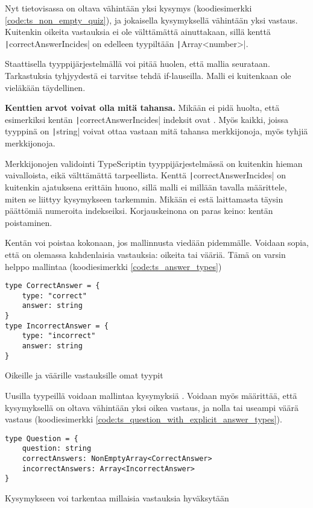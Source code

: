 Nyt tietovisassa on oltava vähintään yksi kysymys (koodiesimerkki \ref{code:ts_non_empty_quiz}), ja jokaisella kysymyksellä vähintään yksi vastaus. Kuitenkin oikeita vastauksia ei ole välttämättä ainuttakaan, sillä kenttä \texttt|correctAnswerIncides| on edelleen tyypiltään \texttt|Array<number>|.

Staattisella tyyppijärjestelmällä voi pitää huolen, että mallia seurataan. Tarkastuksia tyhjyydestä ei tarvitse tehdä if-lauseilla. Malli ei kuitenkaan ole vieläkään täydellinen.

\textbf{Kenttien arvot voivat olla mitä tahansa.} Mikään ei pidä huolta, että esimerkiksi kentän \texttt|correctAnswerIncides| indeksit ovat . Myös kaikki, joissa tyyppinä on \texttt|string| voivat ottaa vastaan mitä tahansa merkkijonoja, myös tyhjiä merkkijonoja.

Merkkijonojen validointi TypeScriptin tyyppijärjestelmässä on kuitenkin hieman vaivalloista, eikä välttämättä tarpeellista. Kenttä \texttt|correctAnswerIncides| on kuitenkin ajatuksena erittäin huono, sillä malli ei millään tavalla määrittele, miten se liittyy kysymykseen tarkemmin. Mikään ei estä laittamasta täysin päättömiä numeroita  indekseiksi. Korjauskeinona on paras keino: kentän poistaminen.

Kentän voi poistaa kokonaan, jos mallinnusta viedään pidemmälle. Voidaan sopia, että on olemassa kahdenlaisia vastauksia: oikeita tai vääriä. Tämä on varsin helppo mallintaa (koodiesimerkki \ref{code:ts_answer_types})

\begin{code}
    \begin{verbatim}
type CorrectAnswer = {
    type: "correct"
    answer: string
}
type IncorrectAnswer = {
    type: "incorrect"
    answer: string
}
    \end{verbatim}
    \caption{Oikeille ja väärille vastauksille omat tyypit}
    \label{code:ts_answer_types}
\end{code}

Uusilla tyypeillä voidaan mallintaa kysymyksiä . Voidaan myös määrittää, että kysymyksellä on oltava vähintään yksi oikea vastaus, ja nolla tai useampi väärä vastaus (koodiesimerkki \ref{code:ts_question_with_explicit_answer_types}).

\begin{code}
    \begin{verbatim}
type Question = {
    question: string
    correctAnswers: NonEmptyArray<CorrectAnswer>
    incorrectAnswers: Array<IncorrectAnswer>
}
    \end{verbatim}
    \caption{Kysymykseen voi tarkentaa millaisia vastauksia hyväksytään}
    \label{code:ts_question_with_explicit_answer_types}
\end{code}

